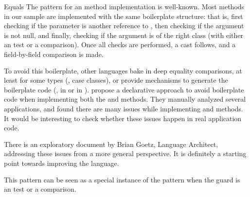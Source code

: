 \begin{pattern}{Equals}
\issues{}
The pattern for an  method implementation is well-known.
Most  methods in our sample are implemented with the same boilerplate structure:
that is, first checking if the parameter is another reference to ,
then checking if the argument is not null,
and finally, checking if the argument is of the right class
(with either an  test or a  comparison).
Once all checks are performed, a cast follows, and a field-by-field comparison is made.

To avoid this boilerplate, other languages bake in deep equality comparisons,
at least for some types (\eg, \scala{} case classes),
or provide mechanisms to generate the boilerplate code (\eg, 
in \haskell{} or \code{\#[derive(Eq)]} in \rust{}).
\cite{vaziriDeclarativeObjectIdentity2007} propose a declarative approach to avoid boilerplate code when implementing
both the  and  methods.
They manually analyzed several applications, and found there are many issues while implementing  and  methods.
It would be interesting to check whether these issues happen in real application code.

There is an exploratory document%
by Brian Goetz, \java{} Language Architect,
addressing these issues from a more general perspective.
It is definitely a starting point towards improving the \java{} language.

This pattern can be seen as a special instance of the  pattern when the guard is an  test or a  comparison.

\end{pattern}